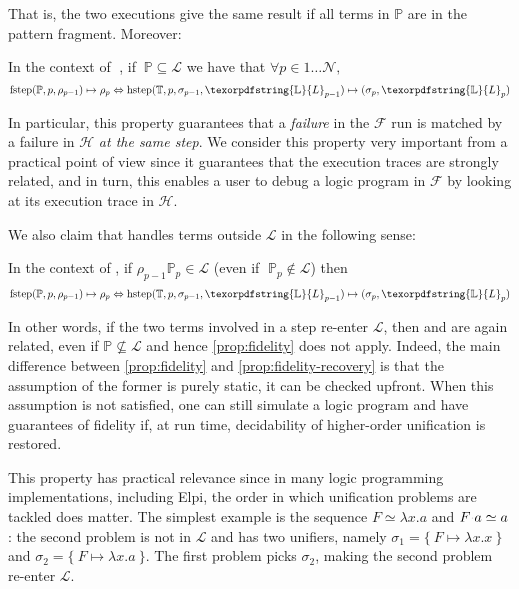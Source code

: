 \documentclass[sigconf,natbib=false,review]{acmart}
\newcommand{\appsep}{\ensuremath{\textcolor{lightgray}{\cdot}}}
\newcommand{\UnifRel}{\ensuremath{\simeq}}
\newcommand{\llambda}{\ensuremath{\mathcal{L}}\xspace}
\newcommand{\Fo}{\texorpdfstring{\ensuremath{\mathcal{F}\xspace}}{F}} %
\newcommand{\Ho}{\texorpdfstring{\ensuremath{\mathcal{H}}\xspace}{H}}
\newcommand{\linkStore}{\texorpdfstring{\ensuremath{\mathbb{L}}\xspace}{L}}
\newcommand{\foUnifPb}{\ensuremath{\mathbb{P}}\xspace}
\newcommand{\hoUnifPb}{\ensuremath{\mathbb{T}}\xspace}
\begin{document}
\noindent
That is, the two executions give the same result if all terms in
\foUnifPb are in the pattern fragment. Moreover:

\begin{proposition}\label{prop:fidelity}
In the context of$\;$ \hrun, if $~\foUnifPb \subseteq \llambda$ we have that
$\forall p \in 1 \ldots \mathcal{N},$
$$
\stepF{\foUnifPb}{p}{\rho_{p-1}}{\rho_p}
\Leftrightarrow
\stepH{\hoUnifPb}{p}{\sigma_{p-1}}{\linkStore_{p-1}}{\sigma_p}{\linkStore_p}
$$
\end{proposition}
\noindent
In particular, this property guarantees that a \emph{failure} in the \Fo{} run
is matched by a failure in \Ho{} \emph{at the same step}. We consider this
property very important from a practical point of view since it guarantees
that the execution traces are strongly related, and in turn, this enables a user
to debug a logic program in \Fo{} by looking at its execution trace in
\Ho{}.

We also claim that \hrun handles terms outside \llambda in the following sense:

\begin{proposition}\label{prop:fidelity-recovery} 
In the context of \hrun, if 
$\rho_{p-1} \foUnifPb_{p} \in \llambda$ 
(even if $\;\foUnifPb_{p} \not\in \llambda$)
then
$$
\stepF{\foUnifPb}{p}{\rho_{p-1}}{\rho_p} \Leftrightarrow
\stepH{\hoUnifPb}{p}{\sigma_{p-1}}{\linkStore_{p-1}}{\sigma_{p}}{\linkStore_p}
$$
\end{proposition}
  
In other words, if the two terms involved in a step
re-enter \llambda, then \hstep and \fstep are again related, even if
$\foUnifPb \not\subseteq \llambda$ and hence \cref{prop:fidelity} does not apply.
Indeed, the main difference between \cref{prop:fidelity} and \cref{prop:fidelity-recovery}
is that the assumption of the former is purely static, it can be checked upfront. 
When this assumption is not satisfied, one can still simulate a logic program and
have guarantees of fidelity if, at run time, decidability of higher-order
unification is restored.

This property has practical relevance since in many logic programming
implementations, including Elpi, the order in which unification problems
are tackled does matter.
The simplest example is the sequence $F \UnifRel \lambda x.a$ and
$F \appsep a \UnifRel a$: the second problem is not in \llambda and has two
unifiers, namely $\sigma_1 = \{~ F \mapsto \lambda x.x ~\}$ and
$\sigma_2 = \{~ F \mapsto \lambda x.a ~\}$. The first problem picks $\sigma_2$,
making the second problem re-enter \llambda.
\end{document}
